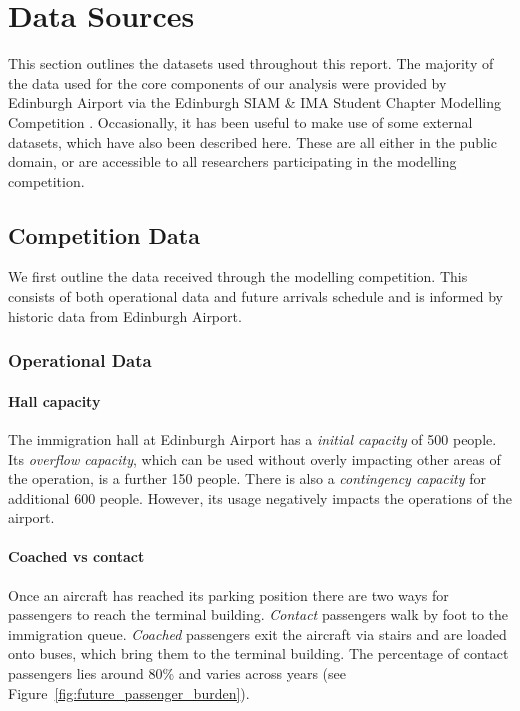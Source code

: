 \documentclass[10pt]{article}
\begin{document}
\section{Data Sources}
This section outlines the datasets used throughout this report. The majority of the data used for the core components of our analysis were provided by Edinburgh Airport via the Edinburgh SIAM \& IMA Student Chapter Modelling Competition \cite{modelling_competition}. Occasionally, it has been useful to make use of some external datasets, which have also been described here. These are all either in the public domain, or are accessible to all researchers participating in the modelling competition. 

\subsection{Competition Data}

We first outline the data received through the modelling competition. This consists of both operational data and future arrivals schedule and is informed by historic data from Edinburgh Airport.


\subsubsection{Operational Data}

\paragraph{Hall capacity}
The immigration hall at Edinburgh Airport has a \textit{initial capacity} of 500 people. Its \textit{overflow capacity}, which can be used without overly impacting other areas of the operation, is a further 150 people. There is also a \textit{contingency capacity} for additional 600 people. However, its usage negatively impacts the operations of the airport.

\paragraph{Coached vs contact}
Once an aircraft has reached its parking position there are two ways for passengers to reach the terminal building. \textit{Contact} passengers walk by foot to the immigration queue. \textit{Coached} passengers exit the aircraft via stairs and are loaded onto buses, which bring them to the terminal building. The percentage of contact passengers lies around 80\% and varies across years (see Figure~\ref{fig:future_passenger_burden}).
\end{document}

